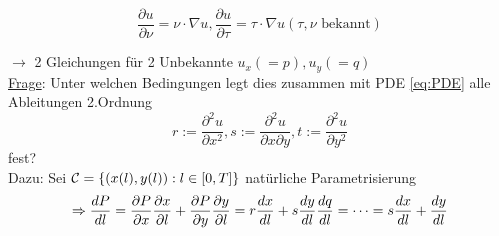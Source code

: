 \[
    \frac{\partial u}{\partial \nu} = \nu \cdot \nabla u, \frac{\partial u}{\partial \tau} = \tau \cdot \nabla u (\tau,\nu \text{ bekannt})
\]

$\to$ 2 Gleichungen für 2 Unbekannte $u_x (=p), u_y(=q)$\\

\underline{Frage}: Unter welchen Bedingungen legt dies zusammen mit PDE \eqref{eq:PDE} alle Ableitungen 2.Ordnung 
\begin{equation} %
    r:=\frac{\partial^2 u}{\partial x^2}, s:= \frac{\partial^2 u}{\partial x\partial y}, t:=\frac{\partial^2 u}{\partial y^2}
    \label{}
\end{equation}
fest?\\

Dazu: Sei $\mathcal{C} = \left\{ (x(l), y(l)): l\in [0,T] \right\}$ natürliche Parametrisierung
\[
    \Rightarrow \frac{dP}{dl} = \frac{\partial P}{\partial x} \frac{\partial x}{\partial l} + \frac{\partial P}{\partial y} \frac{\partial y}{\partial l} = r \frac{dx}{dl} + s \frac{dy}{dl}\\
    \frac{dq}{dl} = \cdots = s \frac{dx}{dl} + \frac{dy}{dl}
\]
